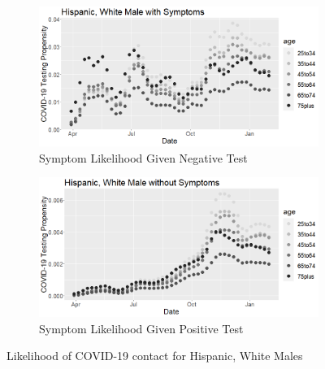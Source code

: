 \documentclass[12pt]{amsart}
\numberwithin{equation}{section}
\theoremstyle{plain}
\begin{document}
\begin{figure}[!th]
\centering
\begin{subfigure}{.5\textwidth}
 \centering
 \includegraphics[width=.9\linewidth]{../figs/tvprop_alt_fig1_supp2.png}
 \caption{Symptom Likelihood Given Negative Test}
\end{subfigure}%
\begin{subfigure}{.5\textwidth}
 \centering
\includegraphics[width=.9\linewidth]{../figs/tvprop_alt_fig2_supp2.png}
 \caption{Symptom Likelihood Given Positive Test}
\end{subfigure}
\caption{Likelihood of COVID-19 contact for Hispanic, White Males}
\label{fig:h-white-male}
\end{figure}
\end{document}
